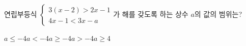 연립부등식 $\begin{cases} 3(x-2)>2x-1 \\ 4x-1<3x-a \end{cases}$가 해를 갖도록 하는 상수 $a$의 값의 범위는?
\begin{choices32}{$a\le -4$}{$a<-4$}{$a\ge -4$}{$a>-4$}{$a\ge 4$}\end{choices32}
